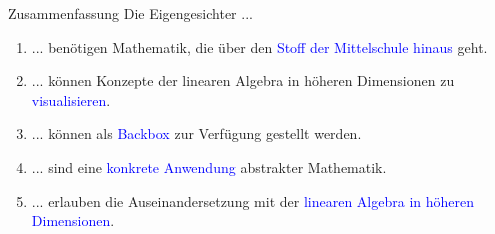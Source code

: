 \documentclass[10pt,aspectratio=169]{beamer}
\begin{document}
\begin{frame}[fragile]{Zusammenfassung}
	Die Eigengesichter ...\\
	\vspace{0.5cm}
	\begin{enumerate}[1.] \setlength\itemsep{0.5cm}
		\item ... benötigen Mathematik, die über den \textcolor{blue}{Stoff der Mittelschule hinaus} geht. 
		\item ... können Konzepte der linearen Algebra in höheren Dimensionen zu \textcolor{blue}{visualisieren}.
		\item ... können als \textcolor{blue}{Backbox} zur Verfügung gestellt werden.
		\item ... sind eine \textcolor{blue}{konkrete Anwendung} abstrakter Mathematik.
		\item ... erlauben die Auseinandersetzung mit der \textcolor{blue}{linearen Algebra in höheren Dimensionen}.
	\end{enumerate}
\end{frame}
	
\end{document}
